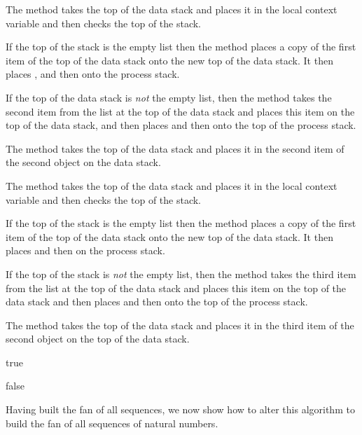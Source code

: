\item The  method takes the top of the data stack and places 
it in the  local context variable and then checks the top of the 
stack. 

If the top of the stack is the empty list then the  method 
places a copy of the first item of the top of the data stack onto the new 
top of the data stack. It then places ,  
and then  onto the process stack. 

If the top of the data stack is \emph{not} the empty list, then the 
 method takes the second item from the list at the top of the 
data stack and places this item on the top of the data stack, and then 
places  and then  onto the top of the 
process stack. 

\item The  method takes the top of the data stack 
and places it in the second item of the second object on the data stack. 

\item The  method takes the top of the data stack and places 
it in the  local context variable and then checks the top of the 
stack. 

If the top of the stack is the empty list then the  method 
places a copy of the first item of the top of the data stack onto the new 
top of the data stack. It then places  and then 
 on the process stack. 

If the top of the stack is \emph{not} the empty list, then the 
 method takes the third item from the list at the top of the 
data stack and places this item on the top of the data stack and then 
places  and then  onto the top of the 
process stack. 

\item The  method takes the top of the data stack 
and places it in the third item of the second object on the top of the 
data stack. 

\stopitemize

\starttyping
\startJoylolCode



\startPrecondition
true
\stopPrecondition




\startPostcondition
false
\stopPostcondition

\stopJoylolCode \stoptyping 

Having built the fan of all  sequences, we now show how to 
alter this algorithm to build the fan of all sequences of natural numbers. 

